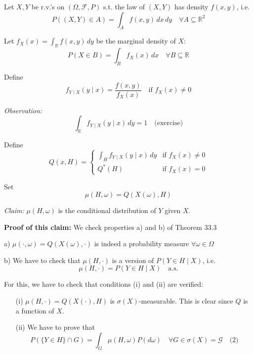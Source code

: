 \begin{example}
Let \(X, Y\) be r.v.'s on \((\Omega, \mathcal{F}, P)\) s.t. the law of \((X, Y)\) has density \(f(x, y)\), i.e.
\[
P((X, Y) \in A) = \int_A f(x, y) \, dx \, dy \quad \forall A \subseteq \mathbb{R}^2
\]

Let \(f_X(x) = \int_{\mathbb{R}} f(x, y) \, dy\) be the marginal density of \(X\):
\[
P(X \in B) = \int_B f_X(x) \, dx \quad \forall B \subseteq \mathbb{R}
\]

Define
\[
f_{Y \mid X}(y \mid x) = \frac{f(x, y)}{f_X(x)} \quad \text{if } f_X(x) \neq 0
\]

\textit{Observation:}
\[
\int_{\mathbb{R}} f_{Y \mid X}(y \mid x) \, dy = 1 \quad \text{(exercise)}
\]

Define
\[
Q(x, H) = \begin{cases}
    \int_H f_{Y \mid X}(y \mid x) \, dy & \text{if } f_X(x) \neq 0 \\
    Q^*(H) & \text{if } f_X(x) = 0
\end{cases}
\]

Set
\[
\mu(H, \omega) = Q(X(\omega), H)
\]

\textit{Claim:} \(\mu(H, \omega)\) is the conditional distribution of \(Y\) given \(X\).
\end{example}

\textbf{Proof of this claim:} We check properties a) and b) of Theorem 33.3

a) \(\mu(\cdot, \omega) = Q(X(\omega), \cdot)\) is indeed a probability measure \(\forall \omega \in \Omega\)

b) We have to check that \(\mu(H, \cdot)\) is a version of \(P(Y \in H \mid X)\), i.e.
\[
\mu(H, \cdot) = P(Y \in H \mid X) \quad \text{a.s.}
\]

For this, we have to check that conditions (i) and (ii) are verified:
\begin{enumerate}
    \item[(i)] \(\mu(H, \cdot) = Q(X(\cdot), H)\) is \(\sigma(X)\)-measurable. This is clear since \(Q\) is a function of \(X\).
    \item[(ii)] We have to prove that
    \[
    P(\{Y \in H\} \cap G) = \int_G \mu(H, \omega) P(d\omega) \quad \forall G \in \sigma(X) = \mathcal{G} \quad \text{(2)}
    \]
\end{enumerate}

